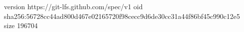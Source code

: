 version https://git-lfs.github.com/spec/v1
oid sha256:56728cc44ad800d467e02165720f98cecc9d6de30cc31a44f86bf45c990c12e5
size 196704
